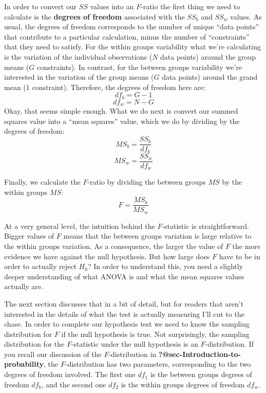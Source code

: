 \documentclass[
  a4paper,
]{book}
\begin{document}
In order to convert our \(SS\) values into an \(F\)-ratio the first
thing we need to calculate is the \textbf{degrees of freedom} associated
with the \(SS_b\) and \(SS_w\) values. As usual, the degrees of freedom
corresponds to the number of unique ``data points'' that contribute to a
particular calculation, minus the number of ``constraints'' that they
need to satisfy. For the within groups variability what we're
calculating is the variation of the individual observations (\(N\) data
points) around the group means (\(G\) constraints). In contrast, for the
between groups variability we're interested in the variation of the
group means (\(G\) data points) around the grand mean (1 constraint).
Therefore, the degrees of freedom here are: \[df_b=G-1\] \[df_w=N-G\]
Okay, that seems simple enough. What we do next is convert our summed
squares value into a ``mean squares'' value, which we do by dividing by
the degrees of freedom: \[MS_b=\frac{SS_b}{df_b}\]
\[MS_w=\frac{SS_w}{df_w}\]

Finally, we calculate the \(F\)-ratio by dividing the between groups
\(MS\) by the within groups \(MS\): \[F=\frac{MS_b}{MS_w}\]

At a very general level, the intuition behind the \(F\)-statistic is
straightforward. Bigger values of \(F\) means that the between groups
variation is large relative to the within groups variation. As a
consequence, the larger the value of \(F\) the more evidence we have
against the null hypothesis. But how large does \(F\) have to be in
order to actually reject \(H_0\)? In order to understand this, you need
a slightly deeper understanding of what ANOVA is and what the mean
squares values actually are.

The next section discusses that in a bit of detail, but for readers that
aren't interested in the details of what the test is actually measuring
I'll cut to the chase. In order to complete our hypothesis test we need
to know the sampling distribution for \(F\) if the null hypothesis is
true. Not surprisingly, the sampling distribution for the
\(F\)-statistic under the null hypothesis is an \(F\)-distribution. If
you recall our discussion of the \(F\)-distribution in
\textbf{?@sec-Introduction-to-probability}, the \(F\)-distribution has
two parameters, corresponding to the two degrees of freedom involved.
The first one \(df_1\) is the between groups degrees of freedom
\(df_b\), and the second one \(df_2\) is the within groups degrees of
freedom \(df_w\).

\hypertarget{tbl-tab13-2}{}
 
\end{document}
